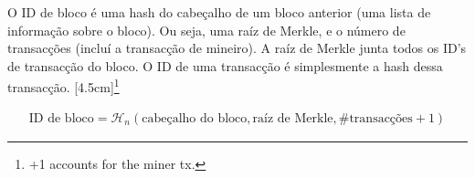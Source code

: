 O ID de bloco é uma hash do cabeçalho de um bloco anterior (uma lista de informação sobre o bloco). Ou seja, uma raíz de Merkle, e o número de transacções (incluí a transacção de mineiro). A raíz de Merkle junta todos os ID's de transacção do bloco. O ID de uma transacção é simplesmente a hash dessa transacção.    
[4.5cm]\footnote{+1 accounts for the miner tx.}\vspace{.175cm}

\begin{align*}
\textrm{ID de bloco} = \mathcal{H}_n(\textrm{cabeçalho do bloco}, \textrm{raíz de Merkle}, \# \textrm{transacções} + 1)
\end{align*}

\vspace{.05cm}

